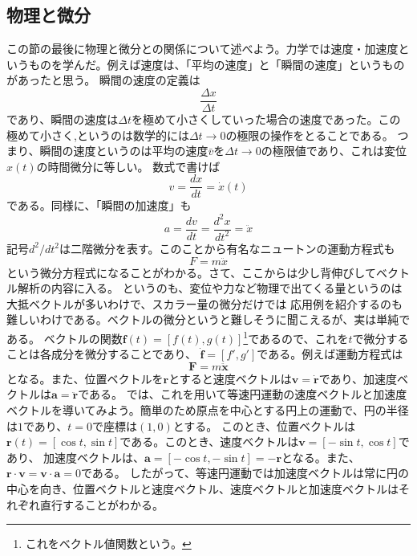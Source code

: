 \documentclass[a4j,dvipdfmx]{jsarticle}
\begin{document}
                \subsection{物理と微分}
                    この節の最後に物理と微分との関係について述べよう。力学では速度・加速度というものを学んだ。例えば速度は、「平均の速度」と「瞬間の速度」というものがあったと思う。
                    瞬間の速度の定義は
                    \begin{equation}
                        \frac{\Delta x}{\Delta t}
                    \end{equation}
                    であり、瞬間の速度は$\Delta t$を極めて小さくしていった場合の速度であった。この極めて小さく,というのは数学的には$\Delta t\to 0$の極限の操作をとることである。
                    つまり、瞬間の速度というのは平均の速度$\bar{v}$を$\Delta t\to 0$の極限値であり、これは変位$x(t)$の時間微分に等しい。
                    数式で書けば
                    \begin{equation}
                        v=\frac{dx}{dt}=\dot{x}(t)
                    \end{equation}
                    である。同様に、「瞬間の加速度」も
                    \begin{equation}
                        a=\frac{dv}{dt}=\frac{d^2 x}{dt^2}=\ddot{x}
                    \end{equation}
                    記号$d^2/dt^2$は二階微分を表す。このことから有名なニュートンの運動方程式も
                    \begin{equation}
                        F=m\ddot{x}
                    \end{equation}
                    という微分方程式になることがわかる。さて、ここからは少し背伸びしてベクトル解析の内容に入る。
                    というのも、変位や力など物理で出てくる量というのは大抵ベクトルが多いわけで、スカラー量の微分だけでは
                    応用例を紹介するのも難しいわけである。ベクトルの微分というと難しそうに聞こえるが、実は単純である。
                    ベクトルの関数$\bm{f}(t) =[f(t),g(t)]$\footnote{これをベクトル値関数という。}であるので、これを$t$で微分することは各成分を微分することであり、
                    $\dot{\bm{f}}=[f',g']$である。例えば運動方程式は
                    \begin{equation}
                        \bm{F}=m\ddot{\bm{x}}\label{eq:ニュートンの運動方程式}
                    \end{equation}
                    となる。また、位置ベクトルを$\bm{r}$とすると速度ベクトルは$\bm{v}=\dot{\bm{r}}$であり、加速度ベクトルは$\bm{a}=\ddot{\bm{r}}$である。
                    では、これを用いて等速円運動の速度ベクトルと加速度ベクトルを導いてみよう。簡単のため原点を中心とする円上の運動で、円の半径は$1$であり、$t=0$で座標は$(1,0)$とする。
                    このとき、位置ベクトルは$\bm{r}(t)=[\cos t,\sin t]$である。このとき、速度ベクトルは$\bm{v}=[-\sin t,\cos t]$であり、
                    加速度ベクトルは、$\bm{a}=[-\cos t,-\sin t]=-\bm{r}$となる。また、$\bm{r}\cdot \bm{v}=\bm{v}\cdot\bm{a}=0$である。
                    したがって、等速円運動では加速度ベクトルは常に円の中心を向き、位置ベクトルと速度ベクトル、速度ベクトルと加速度ベクトルはそれぞれ直行することがわかる。
\end{document}
